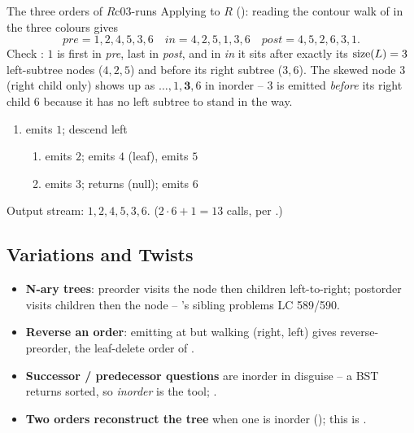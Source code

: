 \begin{example}{The three orders of $R$}{c03-runs}
Applying  to $R$ (): reading the contour walk of
 in the three colours gives
\[
\mathit{pre}=1,2,4,5,3,6\quad
\mathit{in}=4,2,5,1,3,6\quad
\mathit{post}=4,5,2,6,3,1.
\]
Check : $1$ is first in \textit{pre}, last in \textit{post}, and
in \textit{in} it sits after exactly its $\operatorname{size}(L)=3$ left-subtree nodes ($4,2,5$) and
before its right subtree ($3,6$). The skewed node $3$ (right child only) shows up as
$\ldots,1,\mathbf{3},6$ in inorder -- $3$ is emitted \emph{before} its right child $6$
because it has no left subtree to stand in the way.
\end{example}
\begin{tracebox}
\begin{enumerate}[nosep, leftmargin=1.8em]
  \item {} emits $1$; descend left
    \begin{enumerate}[nosep,label=(\alph*),leftmargin=1.4em]
      \item {} emits $2$;  emits $4$ (leaf),  emits $5$
      \item {} emits $3$;  returns (null);  emits $6$
    \end{enumerate}
\end{enumerate}
Output stream: $1,2,4,5,3,6$. \hfill ($2\cdot 6 + 1 = 13$ calls, per .)
\end{tracebox}

\subsection{Variations and Twists}

\begin{itemize}[nosep]
  \item \textbf{N-ary trees}: preorder visits the node then children left-to-right;
        postorder visits children then the node -- 's sibling
        problems LC 589/590.                                        \hfill{}
  \item \textbf{Reverse an order}: emitting at  but walking
        (right, left) gives reverse-preorder, the leaf-delete order of
        .                                      \hfill{}
  \item \textbf{Successor / predecessor questions} are inorder in disguise -- a BST
        returns sorted, so \emph{inorder} is the tool; . \hfill{}
  \item \textbf{Two orders reconstruct the tree} when one is inorder
        (); this is .  \hfill{}
\end{itemize}

